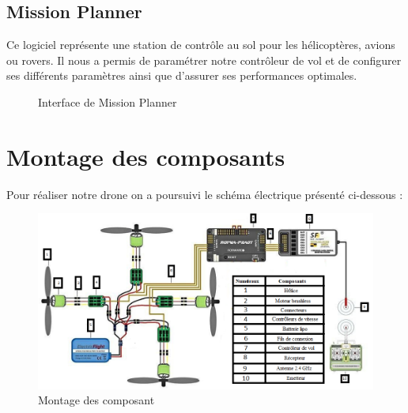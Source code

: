 	\subsection{Mission Planner	}
	Ce logiciel représente une station de contrôle au sol pour les hélicoptères, avions ou rovers. Il nous a permis de paramétrer notre contrôleur de vol et de configurer ses différents paramètres ainsi que d'assurer ses performances optimales.
	\begin{figure} [h]
		\begin{center}
			\centering
			\hspace*{1.5cm}
			\centering
			\hspace*{1.5cm}	\caption{Interface de Mission Planner}
		\end{center}
	\end{figure}
	\newpage
	\section{Montage des composants}
	Pour réaliser notre drone on a poursuivi le schéma électrique présenté ci-dessous :
	
	\begin{figure} [h]
		\begin{center}
			\centering
			\hspace*{-1cm}\includegraphics[width=1.1\linewidth]{Images/Shéma électrique}
		\end{center}
		\caption{Montage des composant}
	\end{figure}
	
